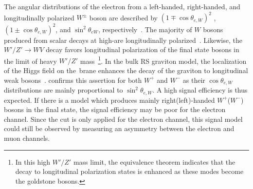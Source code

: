 The angular distributions of the electron from a left-handed, right-handed, and longitudinally polarized $W^{\pm}$ boson are
described by $(1\mp\cos\theta_{e,W})^2$  , $(1\pm\cos\theta_{e,W})^2$, and $\sin^2\theta_{eW}$, respectively~\cite{w_polarization}. The majority of $W$ bosons produced from scalar decays at high-\pt are longitudinally polarized~\cite{w_polarization_2}. Likewise, the $W'/Z'\rightarrow WV$ decay favors longitudinal polarization of the final state bosons in the limit of heavy $W'/Z'$ mass~\cite{hvt_polarization}\footnote{
	In this high $W'/Z'$ mass limit, the equivalence theorem indicates that the decay to longitudinal polarization states is enhanced as these modes become the goldstone bosons.
}. In the bulk RS graviton model, the localization of the Higgs field on the \TeV\,brane enhances the decay of the graviton to longitudinal weak bosons~\cite{rs_graviton}. \Fig{\ref{fig:costhetastar}} confirms this assertion for both $W^+$ and $W^-$ as their $\cos\theta_{e,W}$ distributions are mainly proportional to $\sin^2\theta_{e,W}$.
A high signal efficiency is thus expected. If there is a model which produces mainly right(left)-handed $W^+$($W^-$) bosons in the final state, the signal efficiency may be poor for the electron channel.
Since the cut is only applied for the electron channel, this signal model could still be observed by measuring an asymmetry between the electron and muon channels.

